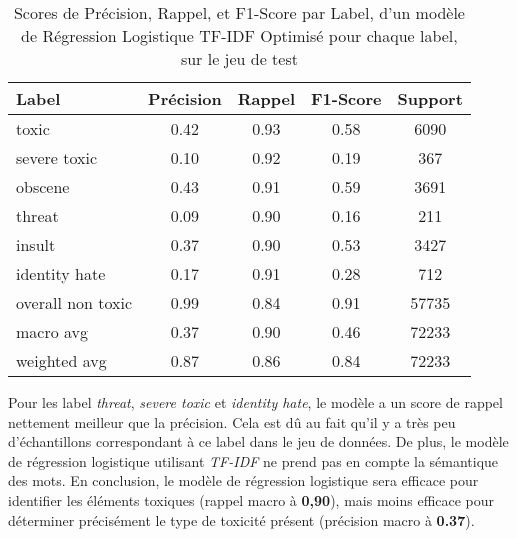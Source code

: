 \begin{table}[ht]
    \centering
    \caption{Scores de Précision, Rappel, et F1-Score par Label, d'un modèle de Régression Logistique TF-IDF Optimisé pour chaque label, sur le jeu de test}    \begin{tabular}{lcccc}
    \hline
    \textbf{Label} & \textbf{Précision} & \textbf{Rappel} & \textbf{F1-Score} & \textbf{Support} \\ \hline
    toxic          & 0.42               & 0.93            & 0.58              & 6090             \\
    severe toxic  & 0.10               & 0.92            & 0.19              & 367              \\
    obscene        & 0.43               & 0.91            & 0.59              & 3691             \\
    threat         & 0.09               & 0.90            & 0.16              & 211              \\
    insult         & 0.37               & 0.90            & 0.53              & 3427             \\
    identity hate & 0.17               & 0.91            & 0.28              & 712              \\
    overall non toxic & 0.99           & 0.84            & 0.91              & 57735            \\\hline
    macro avg      & 0.37               & 0.90            & 0.46              & 72233            \\
    weighted avg   & 0.87               & 0.86            & 0.84              & 72233            \\ \hline
    \end{tabular}
    \label{tab:scores}
\end{table}

Pour les label \textit{threat}, \textit{severe toxic} et \textit{identity hate}, le modèle a un score de rappel nettement meilleur que la précision. 
Cela est dû au fait qu'il y a très peu d'échantillons correspondant à ce label dans le jeu de données. 
De plus, le modèle de régression logistique utilisant \textit{TF-IDF} ne prend pas en compte la sémantique des mots. 
En conclusion, le modèle de régression logistique sera efficace pour identifier les éléments toxiques (rappel macro à \textbf{0,90}), mais moins efficace pour déterminer précisément le type de toxicité présent (précision macro à \textbf{0.37}).

